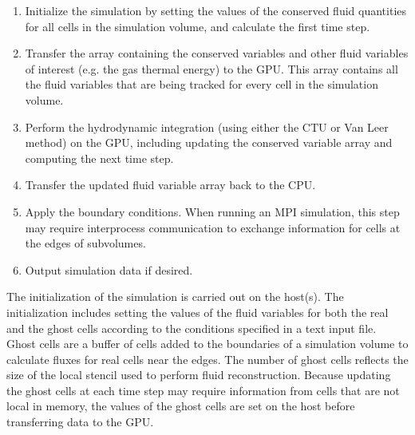 \documentclass[11pt,letterpaper,english]{article}
\begin{document}
\begin{enumerate}\itemsep0pt
\item Initialize the simulation by setting the values of the conserved fluid quantities for all cells in the simulation volume, and calculate the first time step.

\item Transfer the array containing the conserved variables and other fluid variables of interest (e.g. the gas thermal energy) to the GPU. This array contains all the fluid variables that are being tracked for every cell in the simulation volume.

\item Perform the hydrodynamic integration (using either the CTU or Van Leer method) on the GPU, including updating the conserved variable array and computing the next time step.

\item Transfer the updated fluid variable array back to the CPU.

\item Apply the boundary conditions. When running an MPI simulation, this step may require interprocess communication to exchange information for cells at the edges of subvolumes.

\item Output simulation data if desired.

\end{enumerate}

The initialization of the simulation is carried out on the host(s). The initialization includes setting the values of the fluid variables for both the real and the ghost cells according to the conditions specified in a text input file. Ghost cells are a buffer of cells added to the boundaries of a simulation volume to calculate fluxes for real cells near the edges. The number of ghost cells reflects the size of the local stencil used to perform fluid reconstruction. Because updating the ghost cells at each time step may require information from cells that are not local in memory, the values of the ghost cells are set on the host before transferring data to the GPU.
\end{document}
